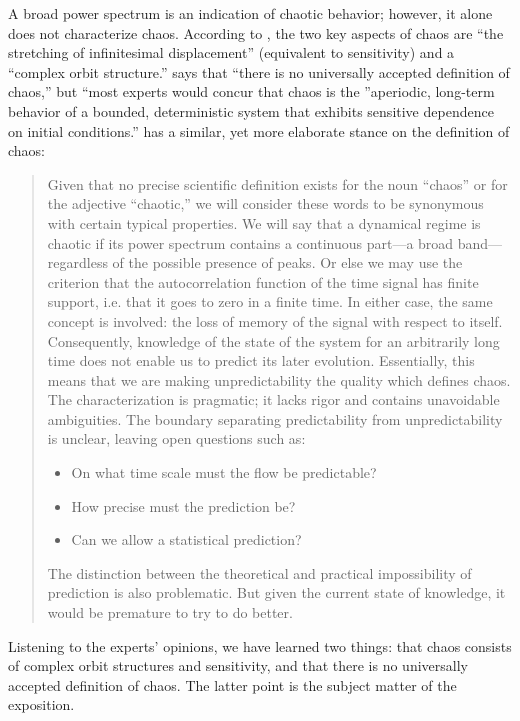 \documentclass[10pt,twoside,draft]{book}
\begin{document}
A broad power spectrum is an indication of chaotic behavior; however, it alone does not characterize chaos.
According to \citet[p.31]{ott1994}, the two key aspects of chaos are ``the stretching of infinitesimal displacement'' (equivalent to sensitivity) and a ``complex orbit structure.'' %
\citet[p.104]{sprott} says that ``there is no universally accepted definition of chaos,'' but ``most experts would concur that chaos is the ''aperiodic, long-term behavior of a bounded, deterministic system that exhibits sensitive dependence on initial conditions.''
\citet[p.103]{berge} has a similar, yet more elaborate stance on the definition of chaos:
\begin{quotation}
  Given that no precise scientific definition exists for the noun ``chaos'' or for the adjective ``chaotic,'' we will consider these words to be synonymous with certain typical properties.
  We will say that a dynamical regime is chaotic if its power spectrum contains a continuous part---a broad band---regardless of the possible presence of peaks.
  Or else we may use the criterion that the autocorrelation function of the time signal has finite support, i.e. that it goes to zero in a finite time.
  In either case, the same concept is involved: the loss of memory of the signal with respect to itself.
  Consequently, knowledge of the state of the system for an arbitrarily long time does not enable us to predict its later evolution.
  Essentially, this means that we are making unpredictability the quality which defines chaos.
  The characterization is pragmatic; it lacks rigor and contains unavoidable ambiguities.
  The boundary separating predictability from unpredictability is unclear, leaving open questions such as:
  \begin{itemize}
    \item 
      On what time scale must the flow be predictable?
    \item 
      How precise must the prediction be?
    \item
      Can we allow a statistical prediction?
\end{itemize}
    The distinction between the theoretical and practical impossibility of prediction is also problematic.
  But given the current state of knowledge, it would be premature to try to do better.
\end{quotation}
Listening to the experts' opinions, we have learned two things: that chaos consists of complex orbit structures and sensitivity, and that there is no universally accepted definition of chaos.
The latter point is the subject matter of the exposition.
\end{document}
